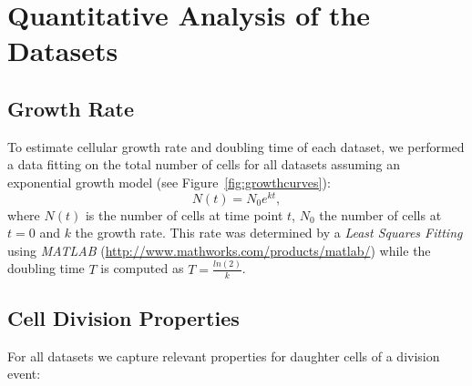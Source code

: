 \documentclass[11pt,a4paper, final]{article}
\newcommand{\TODO}[1]{
\textcolor{red}{TODO:#1}
}
\newenvironment{Itemize}{
 \begin{itemize}[leftmargin=0.5cm]{
}}{\end{itemize}}
\begin{document}
\clearpage
\section{Quantitative Analysis of the Datasets}
\subsection{Growth Rate}
To estimate cellular growth rate and doubling time of each dataset, we performed a data fitting on the total number of cells for all datasets assuming an exponential growth model (see Figure~\ref{fig:growthcurves}):
\begin{equation}
N(t)=N_0e^{kt},
\end{equation}
where $N(t)$ is the number of cells at time point $t$, $N_0$ the number of cells at $t=0$ and $k$ the growth rate. This rate was determined by a \textit{Least Squares Fitting} using \textit{MATLAB} (\href{http://www.mathworks.com/products/matlab/}{http://www.mathworks.com/products/matlab/}) while the doubling time $T$ is computed as $T=\frac{ln(2)}{k}$.


\subsection{Cell Division Properties}
\noindent
For all datasets we capture relevant properties for daughter cells of a division event:
\end{document}
